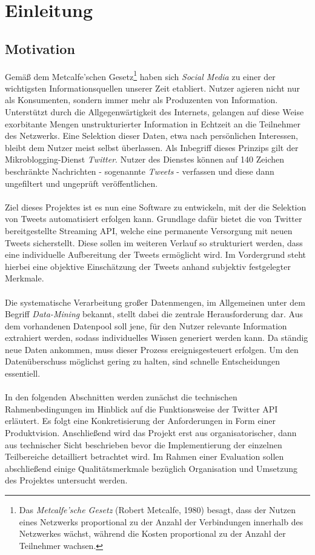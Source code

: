 \chapter{Einleitung}

\section{Motivation}
Gemäß dem Metcalfe'schen Gesetz\footnote{Das \textit{Metcalfe'sche Gesetz} (Robert Metcalfe, 1980) besagt, dass der Nutzen eines Netzwerks proportional zu der Anzahl der Verbindungen innerhalb des Netzwerkes wächst, während die Kosten proportional zu der Anzahl der Teilnehmer wachsen.} haben sich \textit{Social Media} zu einer der wichtigsten Informationsquellen unserer Zeit etabliert. Nutzer agieren nicht nur als Konsumenten, sondern immer mehr als Produzenten von Information. Unterstützt durch die Allgegenwärtigkeit des Internets, gelangen auf diese Weise exorbitante Mengen unstrukturierter Information in Echtzeit an die Teilnehmer des Netzwerks. Eine Selektion dieser Daten, etwa nach persönlichen Interessen, bleibt dem Nutzer meist selbst überlassen.
Als Inbegriff dieses Prinzips gilt der Mikroblogging-Dienst \textit{Twitter}. Nutzer des Dienstes können auf 140 Zeichen beschränkte Nachrichten - sogenannte \textit{Tweets} - verfassen und diese dann ungefiltert und ungeprüft veröffentlichen.\\\\
Ziel dieses Projektes ist es nun eine Software zu entwickeln, mit der die Selektion von Tweets automatisiert erfolgen kann. Grundlage dafür bietet die von Twitter bereitgestellte Streaming API, welche eine permanente Versorgung mit neuen Tweets sicherstellt. Diese sollen im weiteren Verlauf so strukturiert werden, dass eine individuelle Aufbereitung der Tweets ermöglicht wird. Im Vordergrund steht hierbei eine objektive Einschätzung der Tweets anhand subjektiv festgelegter Merkmale.\\\\
Die systematische Verarbeitung großer Datenmengen, im Allgemeinen unter dem Begriff \textit{Data-Mining} bekannt, stellt dabei die zentrale Herausforderung dar. Aus dem vorhandenen Datenpool soll jene, für den Nutzer relevante Information extrahiert werden, sodass individuelles Wissen generiert werden kann. Da ständig neue Daten ankommen, muss dieser Prozess ereignisgesteuert erfolgen. Um den Datenüberschuss möglichst gering zu halten, sind schnelle Entscheidungen essentiell. \\\\
In den folgenden Abschnitten werden zunächst die technischen Rahmenbedingungen im Hinblick auf die Funktionsweise der Twitter API erläutert. Es folgt eine Konkretisierung der Anforderungen in Form einer Produktvision. Anschließend wird das Projekt erst aus organisatorischer, dann aus technischer Sicht beschrieben bevor die Implementierung der einzelnen Teilbereiche detailliert betrachtet wird. Im Rahmen einer Evaluation sollen abschließend einige Qualitätsmerkmale bezüglich Organisation und Umsetzung des Projektes untersucht werden.
\newpage
